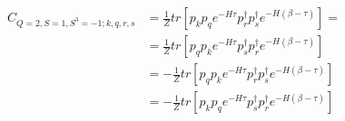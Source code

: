 \begin{equation*}
  \begin{aligned}
    C_{Q=2,S=1,S^3=-1;k,q,r,s} &= \frac{1}{Z}tr\left[p_kp_qe^{-H\tau}p^\dagger_rp^\dagger_se^{-H\left(\beta-\tau\right)}\right] =\\
    &= \frac{1}{Z}tr\left[p_qp_ke^{-H\tau}p^\dagger_sp^\dagger_re^{-H\left(\beta-\tau\right)}\right] \\
    &= - \frac{1}{Z}tr\left[p_qp_ke^{-H\tau}p^\dagger_rp^\dagger_se^{-H\left(\beta-\tau\right)}\right] \\
    &= - \frac{1}{Z}tr\left[p_kp_qe^{-H\tau}p^\dagger_sp^\dagger_re^{-H\left(\beta-\tau\right)}\right]
  \end{aligned}
\end{equation*}

